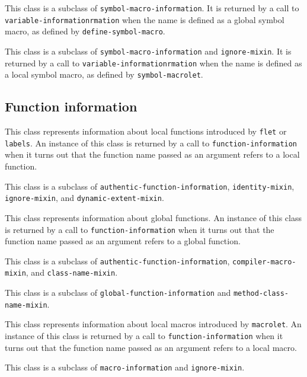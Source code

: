 This class is a subclass of \texttt{symbol-macro-information}.  It is
returned by a call to \texttt{variable-informationrmation} when the name is
defined as a global symbol macro, as defined by
\texttt{define-symbol-macro}.


This class is a subclass of \texttt{symbol-macro-information} and
\texttt{ignore-mixin}.  It is returned by a call to
\texttt{variable-informationrmation} when the name is defined as a local
symbol macro, as defined by \texttt{symbol-macrolet}.

\subsection{Function information}


This class represents information about local functions introduced by
\texttt{flet} or \texttt{labels}.  An instance of this class is
returned by a call to \texttt{function-information} when it turns out that
the function name passed as an argument refers to a local function.

This class is a subclass of \texttt{authentic-function-information},
\texttt{identity-mixin}, \texttt{ignore-mixin}, and \texttt{dynamic-extent-mixin}.


This class represents information about global functions.  An instance
of this class is returned by a call to \texttt{function-information} when it
turns out that the function name passed as an argument refers to a
global function.

This class is a subclass of \texttt{authentic-function-information},
\texttt{compiler-macro-mixin}, and \texttt{class-name-mixin}.


This class is a subclass of \texttt{global-function-information} and
\texttt{method-class-name-mixin}.



This class represents information about local macros introduced by
\texttt{macrolet}.  An instance of this class is returned by a call to
\texttt{function-information} when it turns out that the function name passed
as an argument refers to a local macro.

This class is a subclass of \texttt{macro-information} and \texttt{ignore-mixin}.

